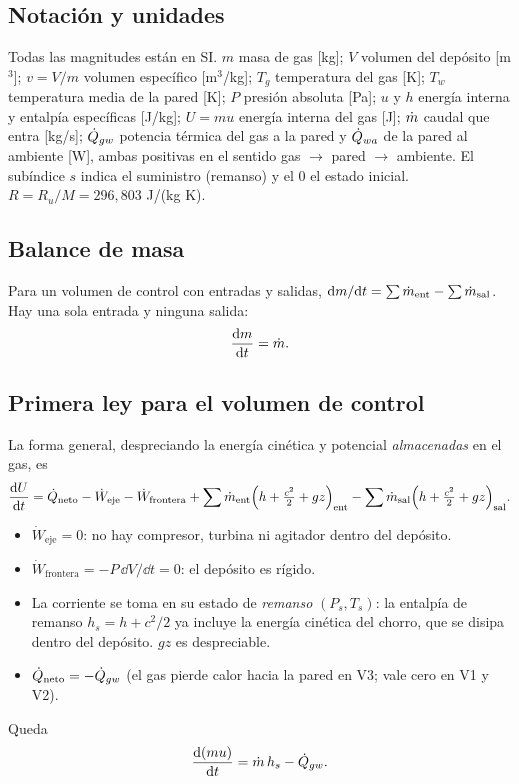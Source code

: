 
\subsection{Notación y unidades}
Todas las magnitudes están en SI. $m$ masa de gas [kg]; $V$ volumen del depósito [m$^3$];
$v=V/m$ volumen específico [m$^3$/kg]; $T_g$ temperatura del gas [K]; $T_w$ temperatura media de la
pared [K]; $P$ presión absoluta [Pa]; $u$ y $h$ energía interna y entalpía específicas [J/kg];
$U=mu$ energía interna del gas [J]; $\dot m$ caudal que entra [kg/s]; $\dot Q_{gw}$ potencia térmica del gas a la
pared y $\dot Q_{wa}$ de la pared al ambiente [W], ambas positivas en el sentido gas $\to$ pared $\to$ ambiente.
El subíndice $s$ indica el suministro (remanso) y el $0$ el estado inicial. $R=R_u/M=296{,}803$ J/(kg K).

\subsection{Balance de masa}
Para un volumen de control con entradas y salidas, $\mathrm{d} m/\mathrm{d} t=\sum \dot m_{\text{ent}}-\sum \dot m_{\text{sal}}$.
Hay una sola entrada y ninguna salida:
\begin{equation}\label{eq:masa}
\frac{\mathrm{d} m}{\mathrm{d} t}=\dot m .
\end{equation}

\subsection{Primera ley para el volumen de control}
La forma general, despreciando la energía cinética y potencial \emph{almacenadas} en el gas, es
\[
\frac{\mathrm{d} U}{\mathrm{d} t}=\dot Q_{\text{neto}}-\dot W_{\text{eje}}-\dot W_{\text{frontera}}
+\sum \dot m_{\text{ent}}\Big(h+\tfrac{c^2}{2}+gz\Big)_{\text{ent}}-\sum \dot m_{\text{sal}}\Big(h+\tfrac{c^2}{2}+gz\Big)_{\text{sal}} .
\]
\begin{itemize}
\item $\dot W_{\text{eje}}=0$: no hay compresor, turbina ni agitador dentro del depósito.
\item $\dot W_{\text{frontera}}=-P\,\dd V/\dd t=0$: el depósito es rígido.
\item La corriente se toma en su estado de \emph{remanso} $(P_s,T_s)$: la entalpía de remanso $h_s=h+c^2/2$
ya incluye la energía cinética del chorro, que se disipa dentro del depósito. $gz$ es despreciable.
\item $\dot Q_{\text{neto}}=-\dot Q_{gw}$ (el gas pierde calor hacia la pared en V3; vale cero en V1 y V2).
\end{itemize}
Queda
\begin{equation}\label{eq:energia}
\frac{\mathrm{d} (mu)}{\mathrm{d} t}=\dot m\,h_s-\dot Q_{gw} .
\end{equation}

